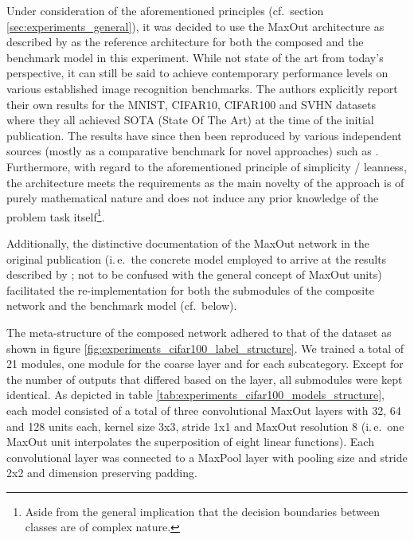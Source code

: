 Under consideration of the aforementioned principles (cf.\ section \ref{sec:experiments_general}), it was decided to use the MaxOut architecture as described by \cite{Goodfellow2013-za} as the reference architecture for both the composed and the benchmark model in this experiment. While not state of the art from today's perspective, it can still be said to achieve contemporary performance levels on various established image recognition benchmarks. The authors explicitly report their own results for the MNIST, CIFAR10, CIFAR100 and SVHN datasets where they all achieved SOTA (State Of The Art) at the time of the initial publication. The results have since then been reproduced by various independent sources (mostly as a comparative benchmark for novel approaches) such as \cite{Lin2013-xh}. Furthermore, with regard to the aforementioned principle of simplicity / leanness, the architecture meets the requirements as the main novelty of the approach is of purely mathematical nature and does not induce any prior knowledge of the problem task itself\footnote{Aside from the general implication that the decision boundaries between classes are of complex nature.}.

Additionally, the distinctive documentation of the MaxOut network in the original publication (i.\,e.\ the concrete model employed to arrive at the results described by \cite{Goodfellow2013-za}; not to be confused with the general concept of MaxOut units) facilitated the re-implementation for both the submodules of the composite network and the benchmark model (cf.\ below).

The meta-structure of the composed network adhered to that of the dataset as shown in figure \ref{fig:experiments_cifar100_label_structure}. We trained a total of 21 modules, one module for the coarse layer and for each subcategory. Except for the number of outputs that differed based on the layer, all submodules were kept identical. As depicted in table \ref{tab:experiments_cifar100_models_structure}, each model consisted of a total of three convolutional MaxOut layers with 32, 64 and 128 units each, kernel size 3x3, stride 1x1 and MaxOut resolution 8 (i.\,e.\ one MaxOut unit interpolates the superposition of eight linear functions). Each convolutional layer was connected to a MaxPool layer with pooling size and stride 2x2 and dimension preserving padding.

\pagebreak

